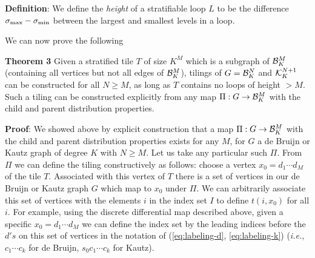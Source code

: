 \documentclass[12pt]{article}
\def\dk{{\cal B}_K}
\begin{document}
\noindent
{\bf Definition}: We define the {\it height} of a stratifiable loop
$L$ to be the difference $\sigma_{\rm max} -\sigma_{{\rm min}}$
between the largest and smallest levels in a loop.
\vspace*{0.1in}

We can now prove the following
\vspace*{0.1in}

\noindent
{\bf Theorem 3} Given a stratified tile $T$ of size $K^{M}$ which is a
subgraph of ${\cal B}_K^{M}$ (containing all vertices but not all
edges
of  ${\cal B}_K^{M}$), tilings of $G ={\cal B}_K^N$ and ${\cal
K}_K^{N + 1}$ can be constructed for all $N \geq M$,
as long as $T$ contains no loops of height $> M$.
Such a tiling can be constructed explicitly from any map
$\Pi:G \rightarrow \dk^M$ with the child and parent distribution properties.


\vspace*{0.1in}
\noindent
{\bf Proof}: We showed above by explicit construction that a map
$\Pi:G \rightarrow \dk^M$ with the child and parent distribution
properties exists for any $M$, for $G$ a de Bruijn or Kautz graph of
degree $K$ with $N \geq M$.  Let us take any particular such $\Pi$.
From $\Pi$ we can define the tiling constructively as follows: choose
a vertex $x_0 =d_1 \cdots d_{M}$ of the tile $T$.  Associated with
this vertex of $T$ there is a set of vertices in our de Bruijn or
Kautz graph $G$ which map to $x_0$ under $\Pi$.  We can arbitrarily
associate this set of vertices with the elements $i$ in the index set
$I$ to define $t (i, x_0)$ for all $i$.  For example, using the
discrete differential map described above, given a specific $x_0 = d_1
\cdots d_M$ we can define the index set by the leading indices before
the $d's$ on this set of vertices in the notation of
(\ref{eq:labeling-d}, \ref{eq:labeling-k}) ({\it i.e.}, $c_1 \cdots
c_k$ for de Bruijn, $s_0c_1 \cdots c_k$ for Kautz).  
\end{document}
